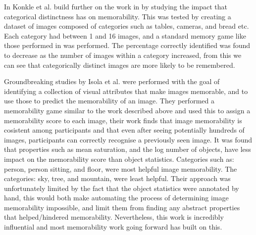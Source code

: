 \documentclass{UoYCSproject}
\begin{document}

In \cite{KonkleDistinct} Konkle et al. build further on the work in \cite{standing10000pictures, brady2008visual} by studying the impact that categorical distinctness has on memorability. This was tested by creating a dataset of images composed of categories such as tables, cameras, and bread etc. Each category had between 1 and 16 images, and a standard memory game like those performed in \cite{NickersonShortTermMemory, standing10000pictures, brady2008visual}
was performed. The percentage correctly identified was found to decrease as the number of images within a category increased, from this we can see that categorically distinct images are more likely to be remembered. 

Groundbreaking studies by Isola et al. \cite{Isola2011, IsolaParikhTorralbaOliva2011} were performed with the goal of identifying a collection of visual attributes that make images memorable, and to use those to predict the memorability of an image.
They performed a memorability game similar to the work described above and used this to assign a memorability score to each image, their work finds that image memorability is cosistent among participants and that even after seeing potentially hundreds of images, participants can correctly recognise a previously seen image.
It was found that properties such as mean saturation, and the log number of objects, have less impact on the memorability score than object statistics.  Categories such as: person, person sitting, and floor, were most helpful image memorability. The categories: sky, tree, and mountain, were least helpful.
Their approach was unfortunately limited by the fact that the object statistics were annotated by hand, this would both make automating the process of determining image memorability impossible, and limit them from finding any abstract properties that helped/hindered memorability. Nevertheless, this work is incredibly influential and most memorability work going forward has built on this.
\end{document}
